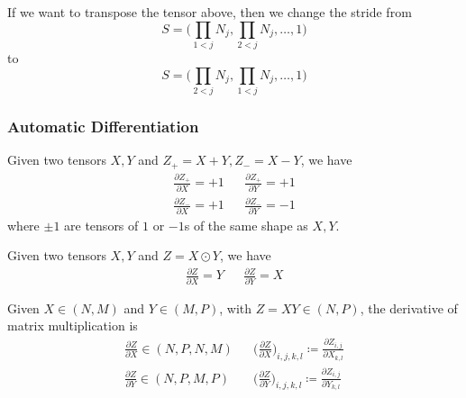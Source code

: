 \documentclass{article}
\begin{document}
    \begin{example}[Transposing]
      If we want to transpose the tensor above, then we change the stride from 
      \begin{equation}
        S = \bigg( \prod_{1 < j} N_j , \prod_{2 < j} N_j, \ldots, 1 \bigg)
      \end{equation} 
      to 
      \begin{equation}
        S = \bigg( \prod_{2 < j} N_j , \prod_{1 < j} N_j, \ldots, 1 \bigg)
      \end{equation} 
    \end{example}

  \subsubsection{Automatic Differentiation} 

    \begin{lemma}[Derivative of $+/-$]
      Given two tensors $X, Y$ and $Z_+ = X + Y, Z_{-} = X - Y$, we have 
      \begin{align}
        \frac{\partial Z_+}{\partial X} = +1 && \frac{\partial Z_+}{\partial Y} = +1 \\ 
        \frac{\partial Z_-}{\partial X} = +1 && \frac{\partial Z_-}{\partial Y} = -1 
      \end{align}
      where $\pm1$ are tensors of $1$ or $-1$s of the same shape as $X, Y$. 
    \end{lemma}

    \begin{lemma}
      Given two tensors $X, Y$ and $Z = X \odot Y$, we have 
      \begin{align}
        \frac{\partial Z}{\partial X} = Y && \frac{\partial Z}{\partial Y} = X
      \end{align}
    \end{lemma} 

    \begin{lemma}
      Given $X \in (N, M)$ and $Y \in (M, P)$, with $Z = XY \in (N, P)$, the derivative of matrix multiplication is 
      \begin{align}
        \frac{\partial Z}{\partial X} \in (N, P, N, M) && \bigg( \frac{\partial Z}{\partial X} \bigg)_{i, j, k, l} \coloneqq \frac{\partial Z_{i, j}}{\partial X_{k, l}} \\
        \frac{\partial Z}{\partial Y} \in (N, P, M, P) && \bigg( \frac{\partial Z}{\partial Y} \bigg)_{i, j, k, l} \coloneqq \frac{\partial Z_{i, j}}{\partial Y_{k, l}} 
      \end{align} 
    \end{lemma} 
\end{document}
